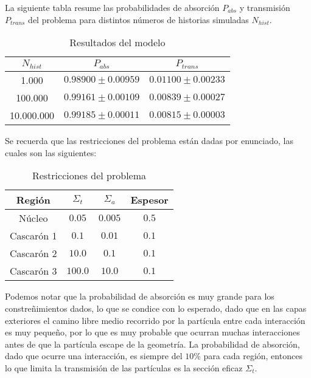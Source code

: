 
La siguiente tabla resume las probabilidades de absorción $P_{abs}$ y transmisión $P_{trans}$ del problema para distintos números de historias simuladas $N_{hist}$. 

\begin{table}[h!]
	\centering
	\begin{tabular}{|c|c|c|}
		\hline
		$N_{hist}$ & $P_{abs}$        & $P_{trans}$      \\ \hline
		1.000           & $0.98900 \pm 0.00959$ & $0.01100 \pm 0.00233$ \\ \hline
		100.000         & $0.99161 \pm 0.00109$ & $0.00839 \pm 0.00027$ \\ \hline
		10.000.000      & $0.99185 \pm 0.00011$ & $0.00815 \pm 0.00003$ \\ \hline
	\end{tabular}
	\caption{Resultados del modelo}
\end{table}

Se recuerda que las restricciones del problema están dadas por enunciado, las cuales son las siguientes:


\begin{table}[h!]
	\centering
	\begin{tabular}{|c|c|c|c|}
		\hline
		Región & $\Sigma_t$ & $\Sigma_a$ & Espesor      \\ \hline
		Núcleo & $0.05$ & $0.005$ & $0.5$ \\ \hline
		Cascarón 1 & $0.1$ & $0.01$ & $0.1$ \\ \hline
		Cascarón 2 & $10.0$ & $0.1$ & $0.1$ \\ \hline
		Cascarón 3 & $100.0$ & $10.0$ & $0.1$ \\ \hline
	\end{tabular}
	\caption{Restricciones del problema}
\end{table}

Podemos notar que la probabilidad de absorción es muy grande para los constreñimientos dados, lo que se condice con lo esperado, dado que en las capas exteriores el camino libre medio recorrido por la partícula entre cada interacción es muy pequeño, por lo que es muy probable que ocurran muchas interacciones antes de que la partícula escape de la geometría. La probabilidad de absorción, dado que ocurre una interacción, es siempre del $10\%$ para cada región, entonces lo que limita la transmisión de las partículas es la sección eficaz $\Sigma_t$.